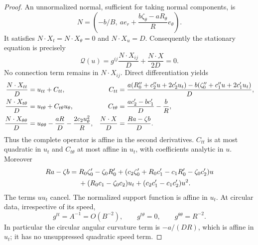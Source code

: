\begin{proof}
An unnormalized normal, sufficient for taking normal components, is
\begin{equation}
 N=\left(-b/B,\ a e_r+
          \frac{b\zeta_\theta-aR_\theta}{R}e_\theta\right).
 \label{gauge:normal}
\end{equation}
It satisfies $N\cdot X_t=N\cdot X_\theta=0$ and $N\cdot X_u=D$.
Consequently the stationary equation is precisely
\begin{equation}
 \mathcal Q(u)=g^{ij}\frac{N\cdot X_{ij}}D
                         +\frac{N\cdot X}{2D}=0.
 \label{gauge:operator}
\end{equation}
No connection term remains in $N\cdot X_{ij}$.  Direct differentiation yields
\begin{align}
 \frac{N\cdot X_{tt}}D&=u_{tt}+C_{tt},
 &C_{tt}&=\frac{a(R_0''+c_2''u+2c_2'u_t)
                    -b(\zeta_0''+c_1''u+2c_1'u_t)}D,\notag\\
 \frac{N\cdot X_{t\theta}}D&=u_{t\theta}+C_{t\theta}u_\theta,
 &C_{t\theta}&=\frac{ac_2'-bc_1'}D-\frac bR,\notag\\
 \frac{N\cdot X_{\theta\theta}}D
        &=u_{\theta\theta}-\frac{aR}D-\frac{2c_2u_\theta^2}R,
 &\frac{N\cdot X}{D}&=\frac{Ra-\zeta b}D.
 \label{gauge:numerators}
\end{align}
Thus the complete operator is affine in the second derivatives.
$C_{tt}$ is at most quadratic in $u_t$ and $C_{t\theta}$ at most affine
in $u_t$, with coefficients analytic in $u$.  Moreover
\begin{align}
 Ra-\zeta b={}&R_0\zeta_0'-\zeta_0R_0'
 +(c_2\zeta_0'+R_0c_1'-c_1R_0'-\zeta_0c_2')u\notag\\
 &+(R_0c_1-\zeta_0c_2)u_t+(c_2c_1'-c_1c_2')u^2.
 \label{gauge:support}
\end{align}
The terms $u u_t$ cancel.  The normalized support function is affine in
$u_t$.  At circular data, irrespective of its speed,
\begin{equation}
       g^{tt}=A^{-1}=O(B^{-2}),\qquad
       g^{t\theta}=0,\qquad g^{\theta\theta}=R^{-2}.
 \label{gauge:circular-cancellation}
\end{equation}
In particular the circular angular curvature term is $-a/(DR)$,
which is affine in $u_t$; it has no unsuppressed quadratic speed term.


\end{proof}

